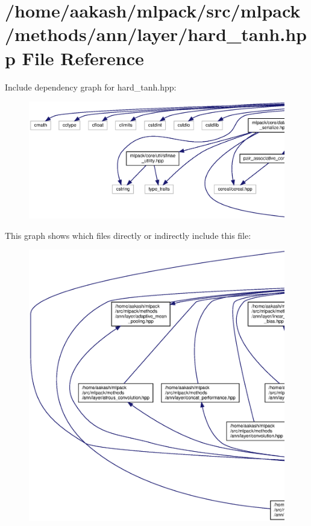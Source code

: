 \section{/home/aakash/mlpack/src/mlpack/methods/ann/layer/hard\+\_\+tanh.hpp File Reference}
\label{hard__tanh_8hpp}
Include dependency graph for hard\+\_\+tanh.\+hpp\+:
\nopagebreak
\begin{figure}[H]
\begin{center}
\leavevmode
\includegraphics[width=350pt]{hard__tanh_8hpp__incl}
\end{center}
\end{figure}
This graph shows which files directly or indirectly include this file\+:
\nopagebreak
\begin{figure}[H]
\begin{center}
\leavevmode
\includegraphics[width=350pt]{hard__tanh_8hpp__dep__incl}
\end{center}
\end{figure}
